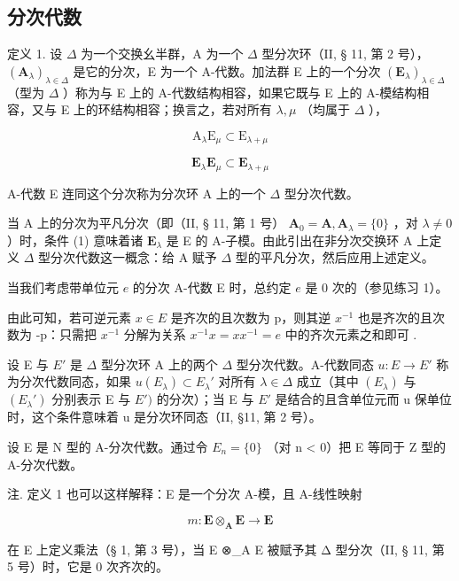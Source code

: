 \subsection{分次代数}

定义 1. 设 \(\Delta\) 为一个交换幺半群，A 为一个 \(\Delta\) 型分次环（II, § 11, 第 2 号）， \((\mathbf{A}_{\lambda})_{\lambda \in \Delta}\) 是它的分次，E 为一个 A-代数。加法群 E 上的一个分次 \((\mathbf{E}_{\lambda})_{\lambda \in \Delta}\) （型为 \(\Delta\) ）称为与 E 上的 A-代数结构相容，如果它既与 E 上的 A-模结构相容，又与 E 上的环结构相容；换言之，若对所有 \(\lambda, \mu\) （均属于 \(\Delta\) ），

\[
\mathrm{A} _ {\lambda} \mathrm{E} _ {\mu} \subset \mathrm{E} _ {\lambda + \mu}\tag{1}
\]

\[
\mathbf {E} _ {\lambda} \mathbf {E} _ {\mu} \subset \mathbf {E} _ {\lambda + \mu}\tag{2}
\]

A-代数 E 连同这个分次称为分次环 A 上的一个 \(\Delta\) 型分次代数。

当 A 上的分次为平凡分次（即（II, § 11, 第 1 号） \(\mathbf{A}_0 = \mathbf{A}, \mathbf{A}_{\lambda} = \{0\}\) ，对 \(\lambda \neq 0\) ）时，条件 (1) 意味着诸 \(\mathbf{E}_{\lambda}\) 是 E 的 A-子模。由此引出在非分次交换环 A 上定义 \(\Delta\) 型分次代数这一概念：给 A 赋予 \(\Delta\) 型的平凡分次，然后应用上述定义。

当我们考虑带单位元 \(e\) 的分次 A-代数 E 时，总约定 \(e\) 是 0 次的（参见练习 1）。

由此可知，若可逆元素 \(x \in E\) 是齐次的且次数为 p，则其逆 \(x^{-1}\) 也是齐次的且次数为 -p：只需把 \(x^{-1}\) 分解为关系 \(x^{-1}x = xx^{-1} = e\) 中的齐次元素之和即可 .

设 E 与 \(E'\) 是 \(\Delta\) 型分次环 A 上的两个 \(\Delta\) 型分次代数。A-代数同态 \(u: E \to E'\) 称为分次代数同态，如果 \(u(E_{\lambda}) \subset E_{\lambda}'\) 对所有 \(\lambda \in \Delta\) 成立（其中 \((E_{\lambda})\) 与 \((E_{\lambda}')\) 分别表示 E 与 \(E')\) 的分次）；当 E 与 \(E'\) 是结合的且含单位元而 u 保单位时，这个条件意味着 u 是分次环同态（II, §11, 第 2 号）。

设 E 是 N 型的 A-分次代数。通过令 \(E_{n} = \{0\}\) （对 n \textless{} 0）把 E 等同于 Z 型的 A-分次代数。

注. 定义 1 也可以这样解释：E 是一个分次 A-模，且 A-线性映射

\[
m \colon \mathbf {E} \otimes_ {\mathbf {A}} \mathbf {E} \rightarrow \mathbf {E}
\]

在 E 上定义乘法（§ 1, 第 3 号），当 E ⊗\_A E 被赋予其 Δ 型分次（II, § 11, 第 5 号）时，它是 0 次齐次的。


